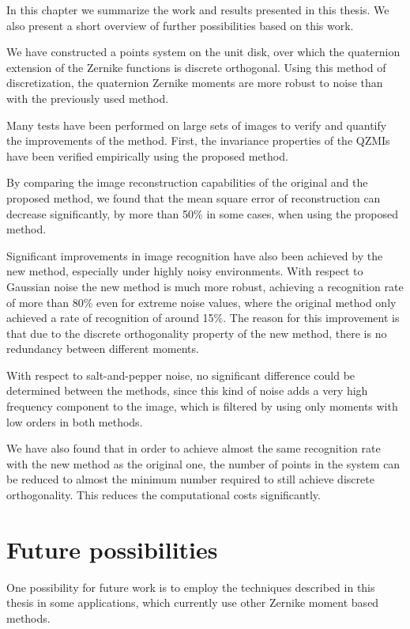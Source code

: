 In this chapter we summarize the work and results presented in this thesis. We also present a short overview of further possibilities based on this work.

We have constructed a points system on the unit disk, over which the quaternion extension of the Zernike functions is discrete orthogonal. Using this method of discretization, the quaternion Zernike moments are more robust to noise than with the previously used method.

Many tests have been performed on large sets of images to verify and quantify the improvements of the method.
First, the invariance properties of the QZMIs have been verified empirically using the proposed method.

By comparing the image reconstruction capabilities of the original and the proposed method, we found that the mean square error of reconstruction can decrease significantly, by more than 50\% in some cases, when using the proposed method.

Significant improvements in image recognition have also been achieved by the new method, especially under highly noisy environments. With respect to Gaussian noise the new method is much more robust, achieving a recognition rate of more than 80\% even for extreme noise values, where the original method only achieved a rate of recognition of around 15\%. The reason for this improvement is that due to the discrete orthogonality property of the new method, there is no redundancy between different moments.

With respect to salt-and-pepper noise, no significant difference could be determined between the methods, since this kind of noise adds a very high frequency component to the image, which is filtered by using only moments with low orders in both methods.

We have also found that in order to achieve almost the same recognition rate with the new method as the original one, the number of points in the system can be reduced to almost the minimum number required to still achieve discrete orthogonality. This reduces the computational costs significantly. 

\section{Future possibilities}
One possibility for future work is to employ the techniques described in this thesis in some applications, which currently use other Zernike moment based methods.

